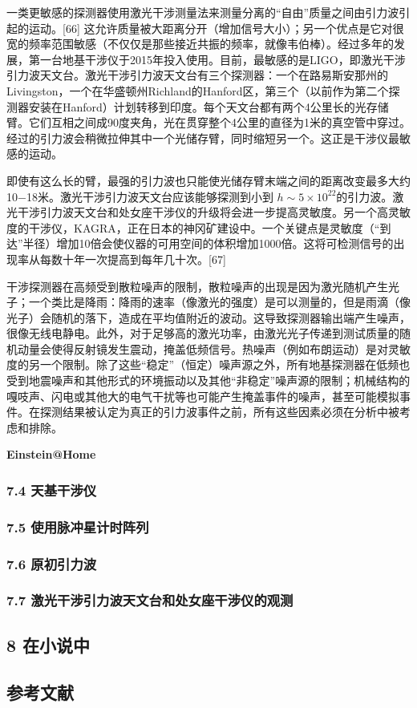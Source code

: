 一类更敏感的探测器使用激光干涉测量法来测量分离的“自由”质量之间由引力波引起的运动。[66] 这允许质量被大距离分开（增加信号大小）；另一个优点是它对很宽的频率范围敏感（不仅仅是那些接近共振的频率，就像韦伯棒）。经过多年的发展，第一台地基干涉仪于2015年投入使用。目前，最敏感的是LIGO，即激光干涉引力波天文台。激光干涉引力波天文台有三个探测器：一个在路易斯安那州的Livingston，一个在华盛顿州Richland的Hanford区，第三个（以前作为第二个探测器安装在Hanford）计划转移到印度。每个天文台都有两个4公里长的光存储臂。它们互相之间成90度夹角，光在贯穿整个4公里的直径为1米的真空管中穿过。经过的引力波会稍微拉伸其中一个光储存臂，同时缩短另一个。这正是干涉仪最敏感的运动。

即使有这么长的臂，最强的引力波也只能使光储存臂末端之间的距离改变最多大约10−18米。激光干涉引力波天文台应该能够探测到小到 $h \sim 5 \times 10^{22}$的引力波。激光干涉引力波天文台和处女座干涉仪的升级将会进一步提高灵敏度。另一个高灵敏度的干涉仪，KAGRA，正在日本的神冈矿建设中。一个关键点是灵敏度（“到达”半径）增加10倍会使仪器的可用空间的体积增加1000倍。这将可检测信号的出现率从每数十年一次提高到每年几十次。[67]

干涉探测器在高频受到散粒噪声的限制，散粒噪声的出现是因为激光随机产生光子；一个类比是降雨：降雨的速率（像激光的强度）是可以测量的，但是雨滴（像光子）会随机的落下，造成在平均值附近的波动。这导致探测器输出端产生噪声，很像无线电静电。此外，对于足够高的激光功率，由激光光子传递到测试质量的随机动量会使得反射镜发生震动，掩盖低频信号。热噪声（例如布朗运动）是对灵敏度的另一个限制。除了这些“稳定”（恒定）噪声源之外，所有地基探测器在低频也受到地震噪声和其他形式的环境振动以及其他“非稳定”噪声源的限制；机械结构的嘎吱声、闪电或其他大的电气干扰等也可能产生掩盖事件的噪声，甚至可能模拟事件。在探测结果被认定为真正的引力波事件之前，所有这些因素必须在分析中被考虑和排除。


\textbf{Einstein@Home}

\subsubsection{7.4 天基干涉仪}

\subsubsection{7.5 使用脉冲星计时阵列}

\subsubsection{7.6 原初引力波}

\subsubsection{7.7 激光干涉引力波天文台和处女座干涉仪的观测}

\subsection{8 在小说中}

\subsection{参考文献}